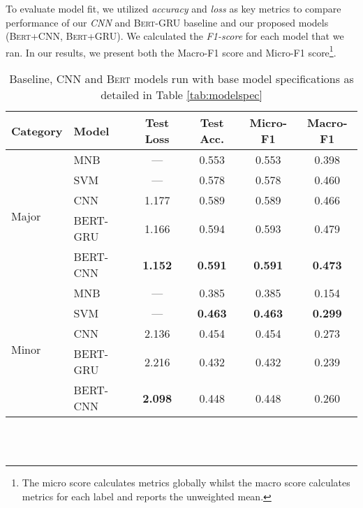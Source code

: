 \documentclass[11pt]{article}
\begin{document}
To evaluate model fit, we utilized \emph{accuracy} and \emph{loss} as key metrics to compare performance of our \textit{CNN} and \textsc{Bert-GRU} baseline and our proposed models (\textsc{Bert+CNN}, \textsc{Bert+GRU}). We calculated the \emph{F1-score} for each model that we ran. In our results, we present both the Macro-F1 score and Micro-F1 score\footnote{The micro score calculates metrics globally whilst the macro score calculates metrics for each label and reports the unweighted mean.}.

\begin{table}[htbp]
  \centering
    \begin{tabular}{llcccc}
    \toprule
    Category & Model & Test Loss  & Test Acc. & Micro-F1 & Macro-F1 \\
    \midrule
    \multirow{5}[2]{*}{Major} & MNB   &   ---  & 0.553 & 0.553 & 0.398 \\
          & SVM   &   ---  & 0.578 & 0.578 & 0.460 \\
          & CNN   & 1.177 & 0.589 & 0.589 & 0.466 \\
          & BERT-GRU & 1.166 & 0.594 & 0.593 & 0.479 \\
          & BERT-CNN & \textbf{1.152} & \textbf{0.591} & \textbf{0.591} & \textbf{0.473} \\
    \midrule
    \multirow{5}[1]{*}{Minor} & MNB   &   ---  & 0.385 & 0.385 & 0.154 \\
          & SVM   &   ---  & \textbf{0.463} & \textbf{0.463} & \textbf{0.299} \\
          & CNN   & 2.136 & 0.454 & 0.454 & 0.273 \\
          & BERT-GRU & 2.216 & 0.432 & 0.432 & 0.239 \\
          & BERT-CNN & \textbf{2.098} & 0.448 & 0.448 & 0.260 \\
    \bottomrule
    \end{tabular} \\~\\
    \caption{Baseline, CNN and \textsc{Bert} models run with base model specifications as detailed in Table \ref{tab:modelspec}}
  \label{tab:modelresults}%
\end{table}%
\end{document}
